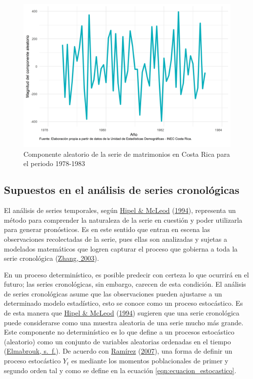 \documentclass[
]{article}
\begin{document}
\begin{figure}[H]
\includegraphics[width=1\linewidth,height=1\textheight]{Tesis_files/figure-latex/ejemplo_aleatorio-1} \caption{Componente aleatorio de la serie de matrimonios en Costa Rica para el periodo 1978-1983}\label{fig:ejemplo_aleatorio}
\end{figure}

\subsection{Supuestos en el análisis de series cronológicas}

El análisis de series temporales, según
\protect\hyperlink{ref-Hipel}{Hipel \& McLeod}
(\protect\hyperlink{ref-Hipel}{1994}), representa un método para
comprender la naturaleza de la serie en cuestión y poder utilizarla para
generar pronósticos. Es en este sentido que entran en escena las
observaciones recolectadas de la serie, pues ellas son analizadas y
sujetas a modelados matemáticos que logren capturar el proceso que
gobierna a toda la serie cronológica
(\protect\hyperlink{ref-Zhang}{Zhang, 2003}).

En un proceso determinístico, es posible predecir con certeza lo que
ocurrirá en el futuro; las series cronológicas, sin embargo, carecen de
esta condición. El análisis de series cronológicas asume que las
observaciones pueden ajustarse a un determinado modelo estadístico, esto
se conoce como un proceso estocástico. Es de esta manera que
\protect\hyperlink{ref-Hipel}{Hipel \& McLeod}
(\protect\hyperlink{ref-Hipel}{1994}) sugieren que una serie cronológica
puede considerarse como una muestra aleatoria de una serie mucho más
grande. Este componente no determinístico es lo que define a un procesos
estocástico (aleatorio) como un conjunto de variables aleatorias
ordenadas en el tiempo
(\protect\hyperlink{ref-definicion_estocastico}{Elmabrouk, s.~f.}). De
acuerdo con \protect\hyperlink{ref-introduccion_series}{Ramírez}
(\protect\hyperlink{ref-introduccion_series}{2007}), una forma de
definir un proceso estocástico \(Y_t\) es mediante los momentos
poblacionales de primer y segundo orden tal y como se define en la
ecuación \ref{eqn:ecuacion_estocastico}.
\end{document}
